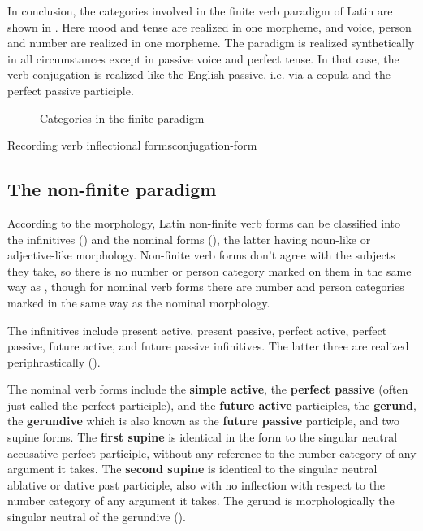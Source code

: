\documentclass[a4paper, oneside, 12pt]{report}
\newcommand*{\concept}[1]{\textbf{#1}}
\begin{document}
In conclusion, the categories involved in the finite verb paradigm of Latin 
are shown in .
Here mood and tense are realized in one morpheme,
and voice, person and number are realized in one morpheme.
The paradigm is realized synthetically in all circumstances 
except in passive voice and perfect tense.
In that case, the verb conjugation is realized like the English passive,
i.e. via a copula and the perfect passive participle.

\begin{figure}[H]
    \centering
    
    \caption{Categories in the finite paradigm}
    \label{fig:paradigm-finite-verb}
\end{figure}

\begin{infobox}{Recording verb inflectional forms}{conjugation-form}
    
\end{infobox}

\subsection{The non-finite paradigm}\label{sec:non-finite-abs}

According to the morphology,
Latin non-finite verb forms can be classified into the infinitives ()
and the nominal forms (),
the latter having noun-like or adjective-like morphology.
Non-finite verb forms don't agree with the subjects they take,
so there is no number or person category marked on them in the same way as ,
though for nominal verb forms there are number and person categories 
marked in the same way as the nominal morphology.

The infinitives include present active, present passive, perfect active, 
perfect passive, future active, and future passive infinitives.
The latter three are realized periphrastically ().

The nominal verb forms include 
the \concept{simple active}, 
the \concept{perfect passive} (often just called the perfect participle), 
and the \concept{future active} participles,
the \concept{gerund}, 
the \concept{gerundive} which is also known as the \concept{future passive} participle, 
and two supine forms.
The \concept{first supine} is identical in the form to the singular neutral accusative perfect participle,
without any reference to the number category of any argument it takes.
The \concept{second supine} is identical to the singular neutral ablative or dative past participle,
also with no inflection with respect to the number category of any argument it takes.
The gerund is morphologically the singular neutral of the gerundive
().
\end{document}
